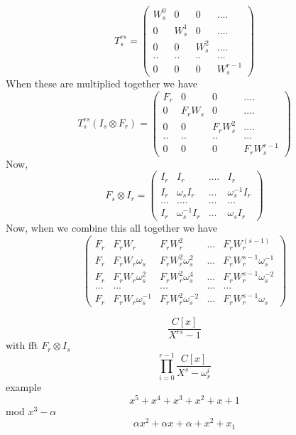 \documentclass{article}
\begin{document}
	\begin{equation}
		T^{rs}_s = \begin{pmatrix}
			W_s^0 & 0 & 0 & .... \\
			0 & W_s^1 & 0 & .... \\
			0 & 0 & W_s^2 & .... \\
			.. & .. & .. & ... \\
			0 & 0 & 0 & W_s^{r-1}
		\end{pmatrix}
	\end{equation}
	When these are multiplied together we have
	\begin{equation}
		T^{rs}_s(I_s \otimes F_r)=
		 \begin{pmatrix}
			F_r & 0 & 0 & .... \\
			0 & F_rW_s & 0 & .... \\
			0 & 0 & F_rW_s^2 & .... \\
			.. & .. & .. & ... \\
			0 & 0 & 0 & F_rW_s^{r-1}
		\end{pmatrix}
	\end{equation}
	Now, 
	\begin{equation}
		F_s \otimes I_r = \begin{pmatrix}
			I_r & I_r & .... & I_r \\
			I_r & \omega_sI_r & ... & \omega_s^{-1}I_r \\
			... & .... & ... & ... \\
			I_r & \omega_s^{-1}I_r & ... & \omega_sI_r
		\end{pmatrix}
	\end{equation}
	Now, when we combine this all together we have
	\begin{equation}
		\begin{pmatrix}
			F_r & F_rW_r & F_rW_r^2 & ... & F_rW_r^(s-1) \\
			F_r & F_rW_r\omega_s & F_rW_r^2\omega_s^2 & ... & F_rW_r^{s-1}\omega_s^{-1} \\
			F_r & F_rW_r\omega_s^2 & F_rW_r^2\omega_s^4 & ... &
			F_rW_r^{s-1}\omega_s^{-2} \\
			...& ...&...&...&...\\
			F_r & F_rW_r\omega_s^{-1} &F_rW_r^2\omega_s^{-2} & ... & F_rW_r^{s-1}\omega_s
			
		\end{pmatrix}
	\end{equation}

	\begin{equation}
	\dfrac{C[x]}{X^{rs}-1}
	\end{equation}
	with fft
	$F_r \otimes I_s$
	\begin{equation}
		\prod_{i=0}^{r-1} \dfrac{C[x]}{X^s-\omega_r^i}
	\end{equation}
	example
	\begin{equation}
		x^5+x^{4}+x^3+x^2+x+1
	\end{equation}
	mod $x^3-\alpha$
	\begin{equation}
		\alpha x^2 + \alpha x + \alpha + x^2 + x _ 1
	\end{equation}
	
\end{document}
